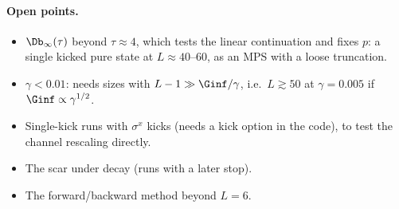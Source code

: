 \paragraph{Open points.}
\begin{itemize}
\item $\Db_\infty(\tau)$ beyond $\tau \approx 4$, which tests the linear continuation and fixes $p$: a single kicked pure state at $L \approx 40$--$60$, as an MPS with a loose truncation.
\item $\gamma < 0.01$: needs sizes with $L - 1 \gg \Ginf/\gamma$, i.e.\ $L \gtrsim 50$ at $\gamma = 0.005$ if $\Ginf \propto \gamma^{1/2}$.
\item Single-kick runs with $\sigma^x$ kicks (needs a kick option in the code), to test the channel rescaling directly.
\item The scar under decay (runs with a later stop).
\item The forward/backward method beyond $L = 6$.
\end{itemize}
